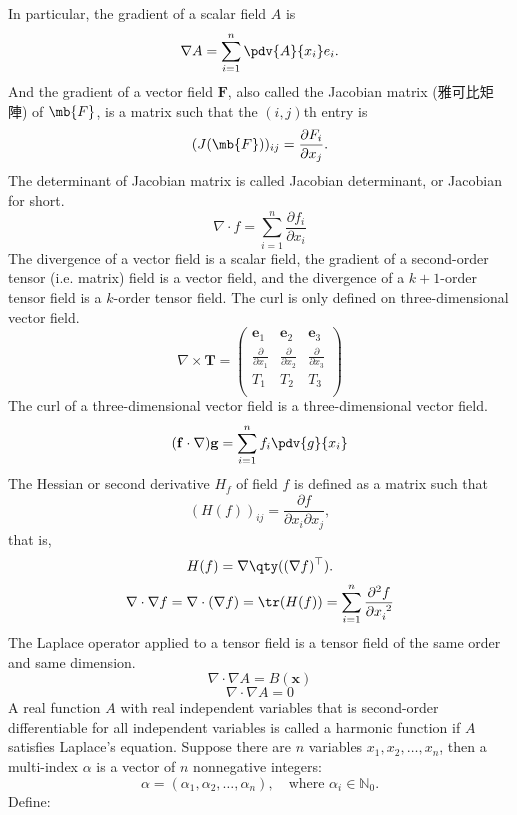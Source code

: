 \documentclass[a4paper,12pt]{report}
\begin{document}
\begin{itemize}
\begin{itemize}
In particular, the gradient of a scalar field $A$ is
\[
\nabla A = \sum_{i=1}^n \pdv{A}{x_i}e_i.
\]
And the gradient of a vector field $\mathbf{F}$, also called the Jacobian matrix (雅可比矩陣) of $\mb{F}$, is a matrix such that the $( i,j )$th entry is
\[(J(\mb{F}))_{ij}=\frac{\partial F_i}{\partial x_j}.\]
The determinant of Jacobian matrix is called Jacobian determinant, or Jacobian for short.
\[
\nabla \cdot f = \sum_{i=1}^n\frac{\partial f_i}{\partial x_i}
\]
The divergence of a vector field is a scalar field, the gradient of a second-order tensor (i.e. matrix) field is a vector field, and the divergence of a $k+1$-order tensor field is a $k$-order tensor field.
The curl is only defined on three-dimensional vector field.
\[
\nabla \times \mathbf{T} = 
\begin{pmatrix}
\mathbf{e}_1 & \mathbf{e}_2 & \mathbf{e}_3 \\
\frac{\partial}{\partial x_1} & \frac{\partial}{\partial x_2} & \frac{\partial}{\partial x_3} \\
T_1 & T_2 & T_3 \\
\end{pmatrix}
\]
The curl of a three-dimensional vector field is a three-dimensional vector field.
\[(\mathbf{f}\cdot\nabla)\mathbf{g}=\sum_{i=1}^n f_i\pdv{g}{x_i}\]
The Hessian or second derivative $H_f$ of field $f$ is defined as a matrix such that
\[(H(f))_{ij}=\frac{\partial f}{\partial x_i\partial x_j},\]
that is,
\[H(f)=\nabla\qty((\nabla f)^\top).\]
\[\nabla\cdot\nabla f = \nabla \cdot (\nabla f) = \tr(H(f))=\sum_{i=1}^n\frac{\partial^2 f}{\partial x_i^{\phantom{i}2}}\]
The Laplace operator applied to a tensor field is a tensor field of the same order and same dimension.
\[
\nabla\cdot\nabla A = B(\mathbf{x})
\]
\[
\nabla\cdot\nabla A = 0
\]
A real function $A$ with real independent variables that is second-order differentiable for all independent variables is called a harmonic function if $A$ satisfies Laplace's equation.
Suppose there are \( n \) variables \( x_1, x_2, \dots, x_n \), then a multi-index $\alpha$ is a vector of \( n \) nonnegative integers: 
\[
\alpha = (\alpha_1, \alpha_2, \ldots, \alpha_n), \quad \text{where\ } \alpha_i \in \mathbb{N}_0.
\]
Define: 
\begin{itemize}

\end{itemize}
\end{itemize}
\end{itemize}
\end{document}
